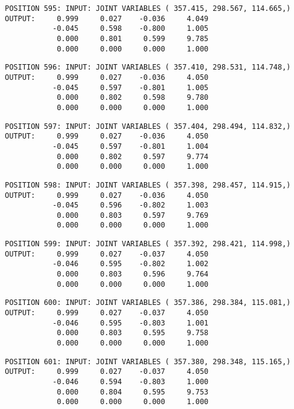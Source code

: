\begin{verbatim}
POSITION 595: INPUT: JOINT VARIABLES ( 357.415, 298.567, 114.665,)
OUTPUT:     0.999     0.027    -0.036     4.049
           -0.045     0.598    -0.800     1.005
            0.000     0.801     0.599     9.785
            0.000     0.000     0.000     1.000
\end{verbatim} \pagebreak[1]\begin{verbatim}
POSITION 596: INPUT: JOINT VARIABLES ( 357.410, 298.531, 114.748,)
OUTPUT:     0.999     0.027    -0.036     4.050
           -0.045     0.597    -0.801     1.005
            0.000     0.802     0.598     9.780
            0.000     0.000     0.000     1.000
\end{verbatim} \pagebreak[1]\begin{verbatim}
POSITION 597: INPUT: JOINT VARIABLES ( 357.404, 298.494, 114.832,)
OUTPUT:     0.999     0.027    -0.036     4.050
           -0.045     0.597    -0.801     1.004
            0.000     0.802     0.597     9.774
            0.000     0.000     0.000     1.000
\end{verbatim} \pagebreak[1]\begin{verbatim}
POSITION 598: INPUT: JOINT VARIABLES ( 357.398, 298.457, 114.915,)
OUTPUT:     0.999     0.027    -0.036     4.050
           -0.045     0.596    -0.802     1.003
            0.000     0.803     0.597     9.769
            0.000     0.000     0.000     1.000
\end{verbatim} \pagebreak[1]\begin{verbatim}
POSITION 599: INPUT: JOINT VARIABLES ( 357.392, 298.421, 114.998,)
OUTPUT:     0.999     0.027    -0.037     4.050
           -0.046     0.595    -0.802     1.002
            0.000     0.803     0.596     9.764
            0.000     0.000     0.000     1.000
\end{verbatim} \pagebreak[1]\begin{verbatim}
POSITION 600: INPUT: JOINT VARIABLES ( 357.386, 298.384, 115.081,)
OUTPUT:     0.999     0.027    -0.037     4.050
           -0.046     0.595    -0.803     1.001
            0.000     0.803     0.595     9.758
            0.000     0.000     0.000     1.000
\end{verbatim} \pagebreak[1]\begin{verbatim}
POSITION 601: INPUT: JOINT VARIABLES ( 357.380, 298.348, 115.165,)
OUTPUT:     0.999     0.027    -0.037     4.050
           -0.046     0.594    -0.803     1.000
            0.000     0.804     0.595     9.753
            0.000     0.000     0.000     1.000
\end{verbatim} \pagebreak[1]\begin{verbatim}

\end{verbatim}
